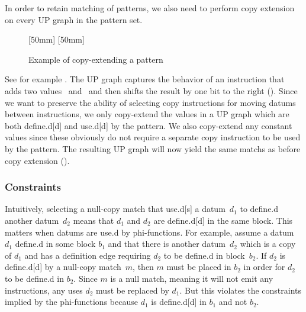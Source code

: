 In order to retain matching of \glspl{pattern}, we also need to perform
\gls{copy extension} on every \gls{UP graph} in the \gls{pattern set}.
%
\begin{figure}
  \setlength{\opNodeDist}{12pt}%

  \mbox{}%
  \hfill%
                [50mm]%
                {%
                }%
  \hfill%
                [50mm]%
                {%
                }%
  \hfill%
  \mbox{}

  \caption{Example of copy-extending a pattern}
\end{figure}
%
See for example .
%
The \gls{UP graph} captures the behavior of an \gls{instruction} that adds two
values~ and~ and then shifts the result by one bit to the
right ().
%
Since we want to preserve the ability of selecting copy \glspl{instruction} for
moving \glspl{datum} between \glspl{instruction}, we only copy-extend the values
in a \gls{UP graph} which are both \gls{define.d}[d] and \gls{use.d}[d] by the
\gls{pattern}.
%
We also copy-extend any constant values since these obviously do not require a
separate copy \gls{instruction} to be used by the \gls{pattern}.
%
The resulting \gls{UP graph} will now yield the same \glspl{match} as before
\gls{copy extension} ().


\subsubsection{Constraints}

Intuitively, selecting a \gls{null-copy match} that \gls{use.d}[s] a
\gls{datum}~$d_1$ to \gls{define.d} another \gls{datum}~$d_2$ means that $d_1$
and $d_2$ are \gls{define.d}[d] in the same \gls{block}.
%
This matters when \glspl{datum} are \gls{use.d} by \glspl{phi-function}.
%
For example, assume a \gls{datum}~$d_1$ \gls{define.d} in some \gls{block} $b_1$
and that there is another \gls{datum}~$d_2$ which is a copy of $d_1$ and has a
\gls{definition edge} requiring $d_2$ to be \gls{define.d} in \gls{block}~$b_2$.
%
If $d_2$ is \gls{define.d}[d] by a \gls{null-copy match}~$m$, then $m$ must be
placed in $b_2$ in order for $d_2$ to be \gls{define.d} in $b_2$.
%
Since $m$ is a \gls{null match}, meaning it will not emit any
\glspl{instruction}, any uses $d_2$ must be replaced by $d_1$.
%
But this violates the \glspl{constraint} implied by the \glspl{phi-function}
because $d_1$ is \gls{define.d}[d] in $b_1$ and not $b_2$.

